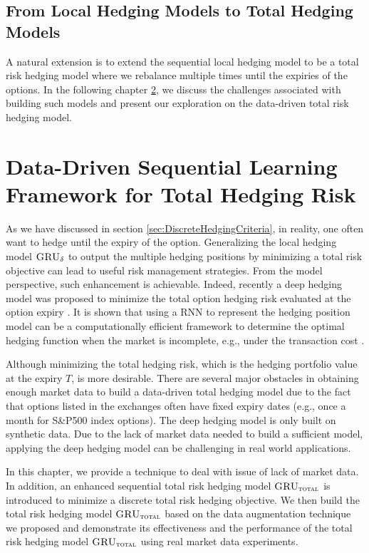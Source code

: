 \documentclass[letterpaper,12pt,titlepage,oneside,final]{book}
\numberwithin{equation}{section}
\theoremstyle{definition}
\newcommand{\model}{\textsc{GRU}_\delta}
\newcommand{\modelT}{\textsc{GRU}_{\textsc{total}}}
\begin{document}
\section{From Local Hedging Models to Total Hedging Models}\label{sec:Localconclusion}
A natural extension  is to extend the sequential local hedging model to be a total risk hedging model where we rebalance multiple times until the expiries of the options. In the following chapter \ref{sec:RNNTotal}, we discuss the challenges associated with building such models and present our exploration on the data-driven total risk hedging model.

\chapter{Data-Driven Sequential Learning Framework for Total Hedging Risk}
\label{sec:RNNTotal}
As we have discussed in section \ref{sec:DiscreteHedgingCriteria}, in reality, one often want to hedge until the expiry of the option. Generalizing the local hedging model $\model$ to output the multiple hedging positions by minimizing a total risk objective can lead to useful risk management strategies. From the model perspective, such enhancement is achievable. Indeed, recently a deep hedging model was proposed to minimize the total option hedging risk evaluated at the option expiry  \citep{buehler2019deep}. It is shown  that using a RNN to represent the hedging position model can be a computationally efficient framework to determine the optimal hedging function when the market is incomplete, e.g., under the transaction cost \citep{buehler2019deep}.

Although minimizing the total hedging risk, which is  the hedging portfolio value at the expiry $T$, is more desirable. There are several major obstacles in obtaining enough market data to build a data-driven total hedging model due to the fact that options listed in the exchanges often have fixed expiry dates (e.g., once a month for S\&P500 index options). The deep hedging model \citep{buehler2019deep} is only built on synthetic data. Due to the lack of market data needed to build a sufficient model, applying the  deep hedging model \citep{buehler2019deep} can be challenging in real world applications.

In this chapter, we  provide a technique to deal with issue of lack of market data. In addition, an enhanced  sequential total risk hedging model $\modelT$ is introduced to minimize a discrete total risk hedging objective. We then build the total risk hedging model $\modelT$ based on the data augmentation technique we proposed and demonstrate its effectiveness  and the performance of  the  total risk hedging model $\modelT$ using real market data experiments.  
\end{document}
